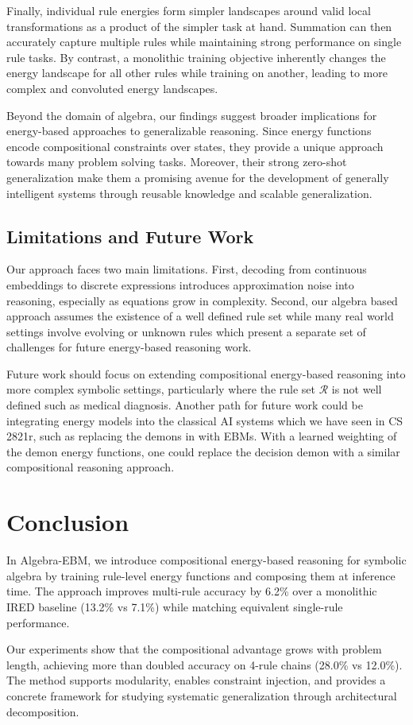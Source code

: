 \documentclass{article}
\begin{document}
Finally, individual rule energies form simpler landscapes around valid local transformations as a product of the simpler task at hand. Summation can then accurately capture multiple rules while maintaining strong performance on single rule tasks. By contrast, a monolithic training objective inherently changes the energy landscape for all other rules while training on another, leading to more complex and convoluted energy landscapes.

Beyond the domain of algebra, our findings suggest broader implications for energy-based approaches to generalizable reasoning. Since energy functions encode compositional constraints over states, they provide a unique approach towards many problem solving tasks. Moreover, their strong zero-shot generalization make them a promising avenue for the development of generally intelligent systems through reusable knowledge and scalable generalization.

\subsection{Limitations and Future Work}

Our approach faces two main limitations. First, decoding from continuous embeddings to discrete expressions introduces approximation noise into reasoning, especially as equations grow in complexity. Second, our algebra based approach assumes the existence of a well defined rule set while many real world settings involve evolving or unknown rules which present a separate set of challenges for future energy-based reasoning work.

Future work should focus on extending compositional energy-based reasoning into more complex symbolic settings, particularly where the rule set $\mathcal{R}$ is not well defined such as medical diagnosis. Another path for future work could be integrating energy models into the classical AI systems which we have seen in CS 2821r, such as replacing the demons in \cite{selfridge1959pandemonium} with EBMs. With a learned weighting of the demon energy functions, one could replace the decision demon with a similar compositional reasoning approach.
\section{Conclusion}

In Algebra-EBM, we introduce compositional energy-based reasoning for symbolic algebra by training rule-level energy functions and composing them at inference time. The approach improves multi-rule accuracy by 6.2\% over a monolithic IRED baseline (13.2\% vs 7.1\%) while matching equivalent single-rule performance.

Our experiments show that the compositional advantage grows with problem length, achieving more than doubled accuracy on 4-rule chains (28.0\% vs 12.0\%). The method supports modularity, enables constraint injection, and provides a concrete framework for studying systematic generalization through architectural decomposition.

\newpage


\end{document}
